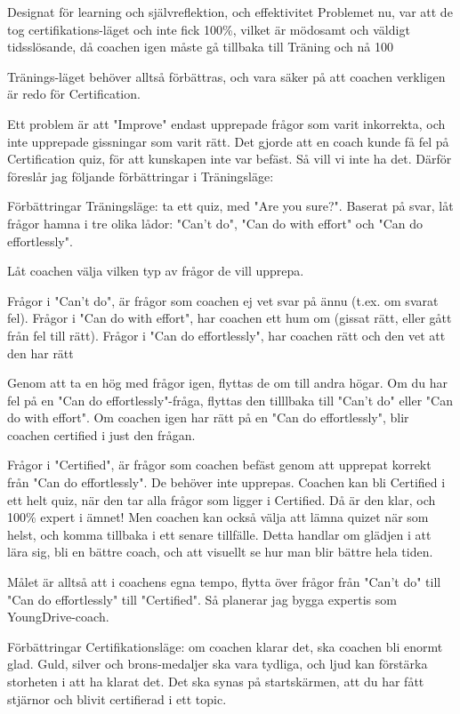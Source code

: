 Designat för learning och självreflektion, och effektivitet
Problemet nu, var att de tog certifikations-läget och inte fick 100\%, vilket är mödosamt och väldigt tidsslösande, då coachen igen måste gå tillbaka till Träning och nå 100%

Tränings-läget behöver alltså förbättras, och vara säker på att coachen verkligen är redo för Certification.

Ett problem är att "Improve" endast upprepade frågor som varit inkorrekta, och inte upprepade gissningar som varit rätt. Det gjorde att en coach kunde få fel på Certification quiz, för att kunskapen inte var befäst. Så vill vi inte ha det. Därför föreslår jag följande förbättringar i Träningsläge:

Förbättringar Träningsläge: ta ett quiz, med "Are you sure?". Baserat på svar, låt frågor hamna i tre olika lådor: "Can't do", "Can do with effort" och "Can do effortlessly".

Låt coachen välja vilken typ av frågor de vill upprepa.

Frågor i "Can't do", är frågor som coachen ej vet svar på ännu (t.ex. om svarat fel).
Frågor i "Can do with effort", har coachen ett hum om (gissat rätt, eller gått från fel till rätt).
Frågor i "Can do effortlessly", har coachen rätt och den vet att den har rätt

Genom att ta en hög med frågor igen, flyttas de om till andra högar. Om du har fel på en "Can do effortlessly"-fråga, flyttas den tilllbaka till "Can't do" eller "Can do with effort". Om coachen igen har rätt på en "Can do effortlessly", blir coachen certified i just den frågan.

Frågor i "Certified", är frågor som coachen befäst genom att upprepat korrekt från "Can do effortlessly". De behöver inte upprepas. Coachen kan bli Certified i ett helt quiz, när den tar alla frågor som ligger i Certified. Då är den klar, och 100\% expert i ämnet! Men coachen kan också välja att lämna quizet när som helst, och komma tillbaka i ett senare tillfälle. Detta handlar om glädjen i att lära sig, bli en bättre coach, och att visuellt se hur man blir bättre hela tiden.

Målet är alltså att i coachens egna tempo, flytta över frågor från "Can't do" till "Can do effortlessly" till "Certified". Så planerar jag bygga expertis som YoungDrive-coach.

Förbättringar Certifikationsläge: om coachen klarar det, ska coachen bli enormt glad. Guld, silver och brons-medaljer ska vara tydliga, och ljud kan förstärka storheten i att ha klarat det. Det ska synas på startskärmen, att du har fått stjärnor och blivit certifierad i ett topic.

